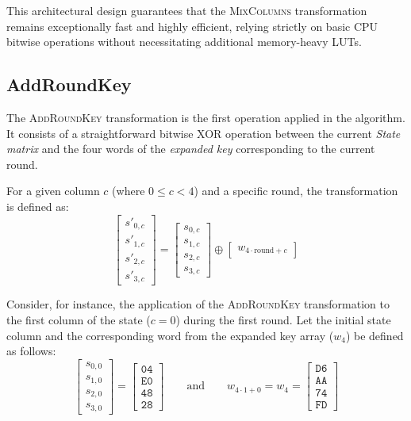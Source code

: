 \documentclass[11pt,a4paper]{report}
\begin{document}
This architectural design guarantees that the \textsc{MixColumns} transformation remains exceptionally fast and highly efficient, 
relying strictly on basic CPU bitwise operations without necessitating additional memory-heavy LUTs.

\subsection{AddRoundKey}
The \textsc{AddRoundKey} transformation is the first operation applied in the algorithm. 
It consists of a straightforward bitwise XOR operation between the current \textit{State matrix} and the four words of the \textit{expanded key} corresponding to the current round.

For a given column $c$ (where $0 \le c < 4$) and a specific round, the transformation is defined as:
\[
\begin{bmatrix} s'_{0,c} \\ s'_{1,c} \\ s'_{2,c} \\ s'_{3,c} \end{bmatrix} 
= 
\begin{bmatrix} s_{0,c} \\ s_{1,c} \\ s_{2,c} \\ s_{3,c} \end{bmatrix} 
\oplus 
\begin{bmatrix} w_{4 \cdot \text{round} + c} \end{bmatrix}
\]

Consider, for instance, the application of the \textsc{AddRoundKey} transformation to the first column of the state ($c = 0$) during the first round. 
Let the initial state column and the corresponding word from the expanded key array ($w_4$) be defined as follows:
\[
\begin{bmatrix} 
    s_{0,0} \\ 
    s_{1,0} \\ 
    s_{2,0} \\ 
    s_{3,0} 
\end{bmatrix} 
= 
\begin{bmatrix} 
    \texttt{04} \\ 
    \texttt{E0} \\ 
    \texttt{48} \\ 
    \texttt{28} 
\end{bmatrix}
\qquad \text{and} \qquad
w_{4 \cdot 1 + 0} = w_4 = 
\begin{bmatrix} 
    \texttt{D6} \\ 
    \texttt{AA} \\ 
    \texttt{74} \\ 
    \texttt{FD} 
\end{bmatrix}
\]
\end{document}

